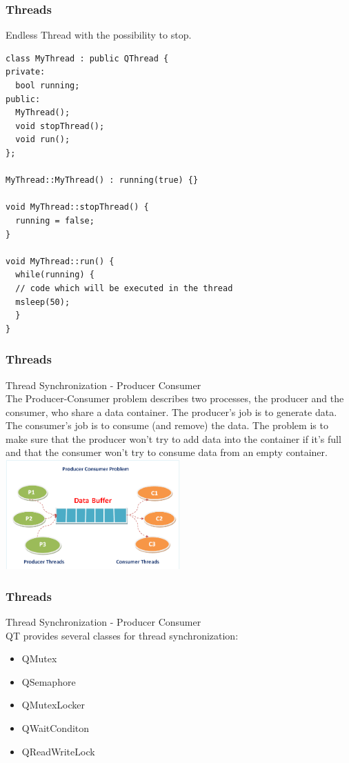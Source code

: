 \begin{frame}[fragile]
\frametitle{Threads}
Endless Thread with the possibility to stop.
{\tiny
\begin{lstlisting}
class MyThread : public QThread {
private:
  bool running;
public:
  MyThread();
  void stopThread();
  void run();
};

MyThread::MyThread() : running(true) {}

void MyThread::stopThread() {
  running = false;
}

void MyThread::run() {
  while(running) {
  // code which will be executed in the thread
  msleep(50);
  }
}
\end{lstlisting}
}
\end{frame}

\begin{frame}[fragile]
\frametitle{Threads}
Thread Synchronization - Producer Consumer\\
{\tiny
The Producer-Consumer problem describes two processes, the producer and the consumer, who share a data container. The producer's job is to generate data. The consumer's job is to consume (and remove) the data. The problem is to make sure that the producer won't try to add data into the container if it's full and that the consumer won't try to consume data from an empty container.
}
\includegraphics[width=190pt]{img/prodcon.png}

\end{frame}

\begin{frame}[fragile]
\frametitle{Threads}
Thread Synchronization - Producer Consumer\\
QT provides several classes for thread synchronization:
\begin{itemize}
\item QMutex
\item QSemaphore
\item QMutexLocker
\item QWaitConditon
\item QReadWriteLock
\end{itemize}

\end{frame}

